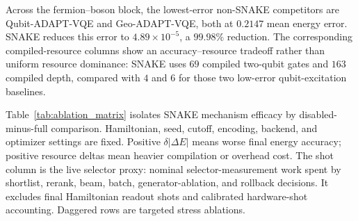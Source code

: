 \documentclass[
  reprint,
  amsmath,
  amssymb,
  aps,
  pra,
  nofootinbib,
  superscriptaddress,
  floatfix
]{revtex4-2}
\newcommand{\tentative}[1]{\textcolor{red!70!black}{#1}}
\begin{document}
Across the fermion--boson block, the lowest-error non-SNAKE competitors are Qubit-ADAPT-VQE and Geo-ADAPT-VQE, both at \tentative{$0.2147$} mean energy error.  SNAKE reduces this error to \tentative{$4.89\!\times\!10^{-5}$}, a \tentative{$99.98\%$} reduction.  The corresponding compiled-resource columns show an accuracy--resource tradeoff rather than uniform resource dominance: SNAKE uses \tentative{$69$} compiled two-qubit gates and \tentative{$163$} compiled depth, compared with \tentative{$4$} and \tentative{$6$} for those two low-error qubit-excitation baselines.

Table~\ref{tab:ablation_matrix} isolates SNAKE mechanism efficacy by disabled-minus-full comparison. Hamiltonian, seed, cutoff, encoding, backend, and optimizer settings are fixed. Positive $\delta|\Delta E|$ means worse final energy accuracy; positive resource deltas mean heavier compilation or overhead cost. The shot column is the live selector proxy: nominal selector-measurement work spent by shortlist, rerank, beam, batch, generator-ablation, and rollback decisions. It excludes final Hamiltonian readout shots and calibrated hardware-shot accounting. Daggered rows are targeted stress ablations.
\end{document}
